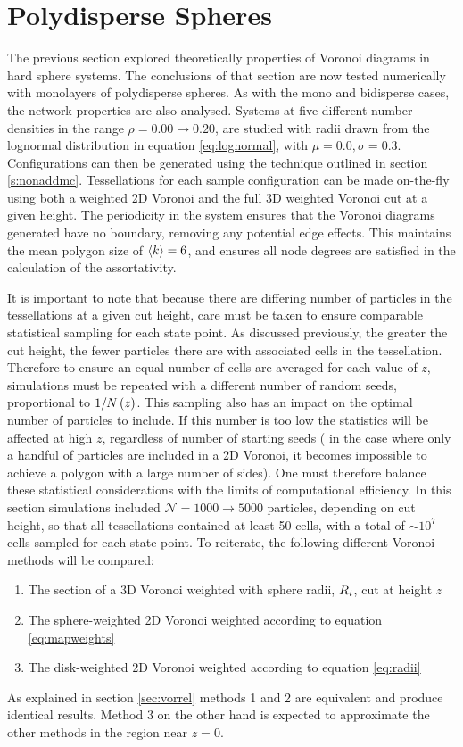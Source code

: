 \section{Polydisperse Spheres}

The previous section explored theoretically properties of Voronoi diagrams in \qtd{} hard sphere systems.
The conclusions of that section are now tested numerically with monolayers of polydisperse spheres.
As with the mono and bidisperse cases, the network properties are also analysed.
Systems at five different number densities in the range $\rho=0.00\rightarrow0.20$, are studied with radii drawn from the lognormal distribution in equation \eqref{eq:lognormal}, with $\mu=0.0,\sigma=0.3$.
Configurations can then be generated using the \mc{} technique outlined in section \ref{s:nonaddmc}.
Tessellations for each sample configuration can be made on-the-fly using both a weighted 2D Voronoi and the full 3D weighted Voronoi cut at a given height.
The periodicity in the system ensures that the Voronoi diagrams generated have no boundary, removing any potential edge effects. 
This maintains the mean polygon size of $\langle k \rangle=6$, and ensures all node degrees are satisfied in the calculation of the assortativity.

It is important to note that because there are differing number of particles in the tessellations at a given cut height, care must be taken to ensure comparable statistical sampling for each state point. 
As discussed previously, the greater the cut height, the fewer particles there are with associated cells in the tessellation.
Therefore to ensure an equal number of cells are averaged for each value of $z$, simulations must be repeated with a different number of random seeds, proportional to  $1/N\left(z\right)$.
This sampling also has an impact on the optimal number of particles to include.
If this number is too low the statistics will be affected at high $z$, regardless of number of starting seeds (\eg{} in the case where only a handful of particles are included in a 2D Voronoi, it becomes impossible to achieve a polygon with a large number of sides).
One must therefore balance these statistical considerations with the limits of computational efficiency.
In this section simulations included $\mathcal{N}=1000\rightarrow 5000$ particles, depending on cut height, so that all tessellations contained at least 50 cells, with a total of $\sim 10^7$ cells sampled for each state point.
To reiterate, the following different Voronoi methods will be compared:
\begin{enumerate}
	\item The section of a 3D Voronoi weighted with sphere radii, $R_i$, cut at height $z$
	\item The sphere\--weighted 2D Voronoi weighted according to equation \eqref{eq:mapweights}
	\item The disk\--weighted 2D Voronoi weighted according to equation \eqref{eq:radii}
\end{enumerate}
As explained in section \ref{sec:vorrel} methods 1 and 2 are equivalent and produce identical results.
Method 3 on the other hand is expected to approximate the other methods in the region near $z=0$.

